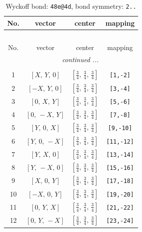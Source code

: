 \documentclass[fleqn,8pt]{jsarticle}
\begin{document}
\renewcommand{\arraystretch}{1.2}
\begin{longtable}{cccc}
\caption{Wyckoff bond: {\tt 48e@4d}, bond symmetry: {\tt 2..}}
 \\
 \hline \hline
No. & vector & center & mapping \\ \hline \endfirsthead

\multicolumn{3}{l}{\tablename\ \thetable{}} \\
 \hline \hline
No. & vector & center & mapping \\ \hline \endhead

 \hline \hline
\multicolumn{3}{r}{\footnotesize\it continued ...} \\ \endfoot

 \hline \hline
\multicolumn{3}{r}{} \\ \endlastfoot

1 & $\left[ X,\, Y,\, 0 \right]$ & $\left[ \frac{3}{4},\, \frac{3}{4},\, \frac{3}{4} \right]$ & {\tt [1,-2]} \\ \hline
2 & $\left[ - X,\, Y,\, 0 \right]$ & $\left[ \frac{3}{4},\, \frac{3}{4},\, \frac{3}{4} \right]$ & {\tt [3,-4]} \\ \hline
3 & $\left[ 0,\, X,\, Y \right]$ & $\left[ \frac{3}{4},\, \frac{3}{4},\, \frac{3}{4} \right]$ & {\tt [5,-6]} \\ \hline
4 & $\left[ 0,\, - X,\, Y \right]$ & $\left[ \frac{3}{4},\, \frac{3}{4},\, \frac{3}{4} \right]$ & {\tt [7,-8]} \\ \hline
5 & $\left[ Y,\, 0,\, X \right]$ & $\left[ \frac{3}{4},\, \frac{3}{4},\, \frac{3}{4} \right]$ & {\tt [9,-10]} \\ \hline
6 & $\left[ Y,\, 0,\, - X \right]$ & $\left[ \frac{3}{4},\, \frac{3}{4},\, \frac{3}{4} \right]$ & {\tt [11,-12]} \\ \hline
7 & $\left[ Y,\, X,\, 0 \right]$ & $\left[ \frac{3}{4},\, \frac{3}{4},\, \frac{3}{4} \right]$ & {\tt [13,-14]} \\ \hline
8 & $\left[ Y,\, - X,\, 0 \right]$ & $\left[ \frac{3}{4},\, \frac{3}{4},\, \frac{3}{4} \right]$ & {\tt [15,-16]} \\ \hline
9 & $\left[ X,\, 0,\, Y \right]$ & $\left[ \frac{3}{4},\, \frac{3}{4},\, \frac{3}{4} \right]$ & {\tt [17,-18]} \\ \hline
10 & $\left[ - X,\, 0,\, Y \right]$ & $\left[ \frac{3}{4},\, \frac{3}{4},\, \frac{3}{4} \right]$ & {\tt [19,-20]} \\ \hline
11 & $\left[ 0,\, Y,\, X \right]$ & $\left[ \frac{3}{4},\, \frac{3}{4},\, \frac{3}{4} \right]$ & {\tt [21,-22]} \\ \hline
12 & $\left[ 0,\, Y,\, - X \right]$ & $\left[ \frac{3}{4},\, \frac{3}{4},\, \frac{3}{4} \right]$ & {\tt [23,-24]} \\
\end{longtable}
\end{document}
